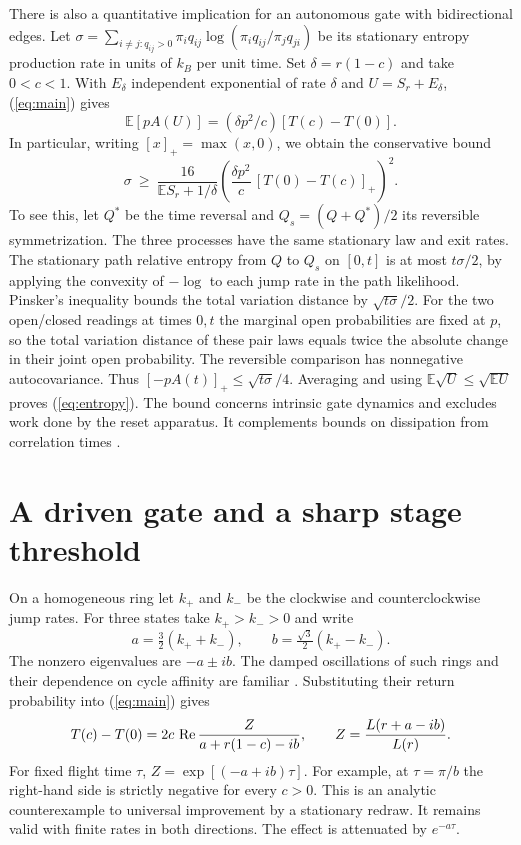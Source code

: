 \documentclass[11pt]{article}
\newcommand{\E}{\mathbb E}
\newcommand{\Rea}{\mathop{\rm Re}}
\begin{document}
There is also a quantitative implication for an autonomous gate with bidirectional edges. Let $\sigma=\sum_{i\ne j:q_{ij}>0}\pi_iq_{ij}\log(\pi_iq_{ij}/\pi_jq_{ji})$ be its stationary entropy production rate in units of $k_B$ per unit time. Set $\delta=r(1-c)$ and take $0<c<1$. With $E_\delta$ independent exponential of rate $\delta$ and $U=S_r+E_\delta$, (\ref{eq:main}) gives
\[
 \E[p A(U)]=(\delta p^2/c)[T(c)-T(0)] .
\]
In particular, writing $[x]_+=\max(x,0)$, we obtain the conservative bound
\begin{equation}
 \sigma\ \ge\
 \frac{16}{\E S_r+1/\delta}
 \left(\frac{\delta p^2}{c}\,[T(0)-T(c)]_+\right)^2 . \label{eq:entropy}
\end{equation}
To see this, let $Q^*$ be the time reversal and $Q_s=(Q+Q^*)/2$ its reversible symmetrization. The three processes have the same stationary law and exit rates. The stationary path relative entropy from $Q$ to $Q_s$ on $[0,t]$ is at most $t\sigma/2$, by applying the convexity of $-\log$ to each jump rate in the path likelihood. Pinsker's inequality bounds the total variation distance by $\sqrt{t\sigma}/2$. For the two open/closed readings at times $0,t$ the marginal open probabilities are fixed at $p$, so the total variation distance of these pair laws equals twice the absolute change in their joint open probability. The reversible comparison has nonnegative autocovariance. Thus $[-pA(t)]_+\le\sqrt{t\sigma}/4$. Averaging and using $\E\sqrt U\le\sqrt{\E U}$ proves (\ref{eq:entropy}). The bound concerns intrinsic gate dynamics and excludes work done by the reset apparatus. It complements bounds on dissipation from correlation times \cite{dechant}.

\section{A driven gate and a sharp stage threshold}
On a homogeneous ring let $k_+$ and $k_-$ be the clockwise and counterclockwise jump rates. For three states take $k_+>k_->0$ and write
\[
 a=\tfrac32(k_++k_-),\qquad b=\tfrac{\sqrt3}{2}(k_+-k_-).
\]
The nonzero eigenvalues are $-a\pm ib$. The damped oscillations of such rings and their dependence on cycle affinity are familiar \cite{barato}. Substituting their return probability into (\ref{eq:main}) gives
\begin{equation}
 T(c)-T(0)=2c\,\Rea\frac{Z}{a+r(1-c)-ib},\qquad
 Z=\frac{L(r+a-ib)}{L(r)} . \label{eq:three}
\end{equation}
For fixed flight time $\tau$, $Z=\exp[(-a+ib)\tau]$. For example, at $\tau=\pi/b$ the right-hand side is strictly negative for every $c>0$. This is an analytic counterexample to universal improvement by a stationary redraw. It remains valid with finite rates in both directions. The effect is attenuated by $e^{-a\tau}$.
\end{document}
